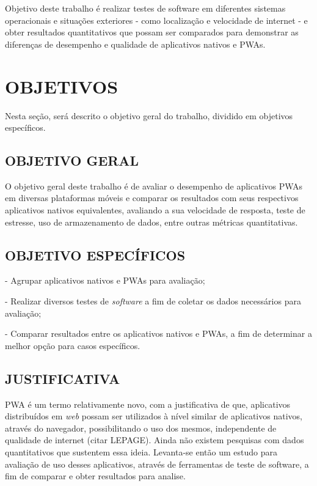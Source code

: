    Objetivo deste trabalho é realizar testes de software em diferentes sistemas operacionais e situações exteriores - como localização e velocidade de internet - e obter resultados quantitativos que possam ser comparados para demonstrar as diferenças de desempenho e qualidade de aplicativos nativos e PWAs.
   
   \section{OBJETIVOS}
   
   Nesta seção, será descrito o objetivo geral do trabalho, dividido em objetivos específicos.
   
   \subsection{OBJETIVO GERAL}
   
   O objetivo geral deste trabalho é de avaliar o desempenho de aplicativos PWAs em diversas plataformas móveis e comparar os resultados com seus respectivos aplicativos nativos equivalentes, avaliando a sua velocidade de resposta, teste de estresse, uso de armazenamento de dados, entre outras métricas quantitativas.
   
   \subsection{OBJETIVO ESPECÍFICOS}
   
   - Agrupar aplicativos nativos e PWAs para avaliação;
   
   - Realizar diversos testes de \textit{software} a fim de coletar os dados necessários para avaliação;
   
   - Comparar resultados entre os aplicativos nativos e PWAs, a fim de determinar a melhor opção para casos específicos.
   
   \subsection{JUSTIFICATIVA}
   
   PWA é um termo relativamente novo, com a justificativa de que, aplicativos distribuídos em \textit{web} possam ser utilizados à nível similar de aplicativos nativos, através do navegador, possibilitando o uso dos mesmos, independente de qualidade de internet (citar LEPAGE). Ainda não existem pesquisas com dados quantitativos que sustentem essa ideia. Levanta-se então um estudo para avaliação de uso desses aplicativos, através de ferramentas de teste de software, a fim de comparar e obter resultados para analise.